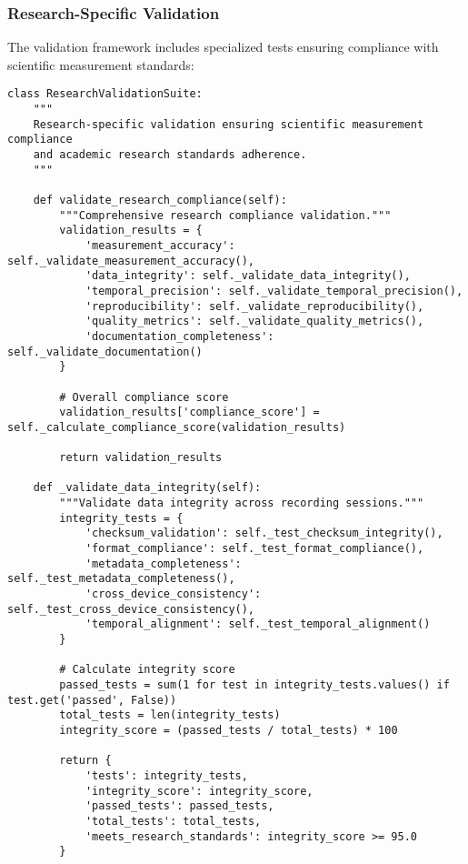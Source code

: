 \documentclass[11pt,a4paper]{article}
\begin{document}
\subsubsection{Research-Specific Validation}

The validation framework includes specialized tests ensuring compliance with scientific measurement standards:

\begin{verbatim}
class ResearchValidationSuite:
    """
    Research-specific validation ensuring scientific measurement compliance
    and academic research standards adherence.
    """

    def validate_research_compliance(self):
        """Comprehensive research compliance validation."""
        validation_results = {
            'measurement_accuracy': self._validate_measurement_accuracy(),
            'data_integrity': self._validate_data_integrity(),
            'temporal_precision': self._validate_temporal_precision(),
            'reproducibility': self._validate_reproducibility(),
            'quality_metrics': self._validate_quality_metrics(),
            'documentation_completeness': self._validate_documentation()
        }

        # Overall compliance score
        validation_results['compliance_score'] = self._calculate_compliance_score(validation_results)

        return validation_results

    def _validate_data_integrity(self):
        """Validate data integrity across recording sessions."""
        integrity_tests = {
            'checksum_validation': self._test_checksum_integrity(),
            'format_compliance': self._test_format_compliance(),
            'metadata_completeness': self._test_metadata_completeness(),
            'cross_device_consistency': self._test_cross_device_consistency(),
            'temporal_alignment': self._test_temporal_alignment()
        }

        # Calculate integrity score
        passed_tests = sum(1 for test in integrity_tests.values() if test.get('passed', False))
        total_tests = len(integrity_tests)
        integrity_score = (passed_tests / total_tests) * 100

        return {
            'tests': integrity_tests,
            'integrity_score': integrity_score,
            'passed_tests': passed_tests,
            'total_tests': total_tests,
            'meets_research_standards': integrity_score >= 95.0
        }
\end{verbatim}
\end{document}
